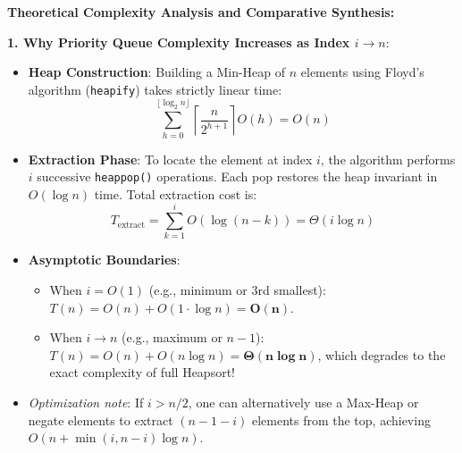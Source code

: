 \documentclass[12pt]{article}
\begin{document}
\newpage

\textbf{Theoretical Complexity Analysis and Comparative Synthesis:}

\begin{table}[H]
\centering
{}
\caption{Comparative evaluation of K-th Order Statistic Selection algorithms.}
\end{table}

\textbf{1. Why Priority Queue Complexity Increases as Index $i \to n$}:
\begin{itemize}
    \item \textbf{Heap Construction}: Building a Min-Heap of $n$ elements using Floyd's algorithm (\texttt{heapify}) takes strictly linear time:
    \[
    \sum_{h=0}^{\lfloor \log_2 n \rfloor} \left\lceil \frac{n}{2^{h+1}} \right\rceil O(h) = O(n)
    \]
    \item \textbf{Extraction Phase}: To locate the element at index $i$, the algorithm performs $i$ successive \texttt{heappop()} operations. Each pop restores the heap invariant in $O(\log n)$ time. Total extraction cost is:
    \[
    T_{\text{extract}} = \sum_{k=1}^i O(\log(n - k)) = \Theta(i \log n)
    \]
    \item \textbf{Asymptotic Boundaries}:
    \begin{itemize}
        \item When $i = O(1)$ (e.g., minimum or 3rd smallest): $T(n) = O(n) + O(1 \cdot \log n) = \mathbf{O(n)}$.
        \item When $i \to n$ (e.g., maximum or $n - 1$): $T(n) = O(n) + O(n \log n) = \mathbf{\Theta(n \log n)}$, which degrades to the exact complexity of full Heapsort!
    \end{itemize}
    \item \textit{Optimization note}: If $i > n/2$, one can alternatively use a Max-Heap or negate elements to extract $(n - 1 - i)$ elements from the top, achieving $O(n + \min(i, n - i) \log n)$.
\end{itemize}
\end{document}
